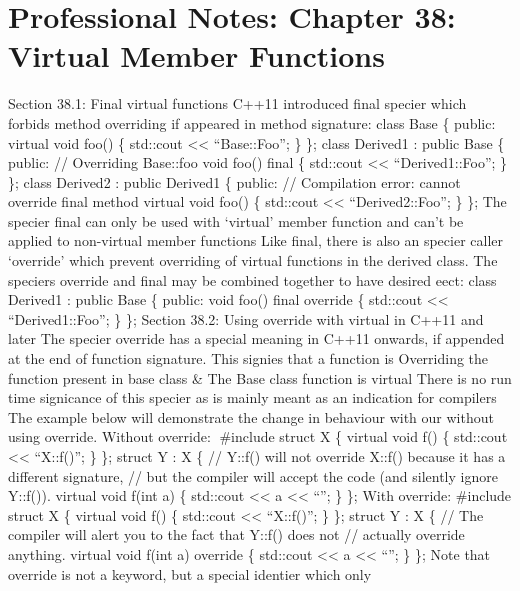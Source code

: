 \hypertarget{professional-notes-chapter-38-virtual-member-functions-1}{%
\chapter{Professional Notes: Chapter 38: Virtual Member
Functions}\label{professional-notes-chapter-38-virtual-member-functions-1}}

Section 38.1: Final virtual functions C++11 introduced final specier
which forbids method overriding if appeared in method signature: class
Base \{ public: virtual void foo() \{ std::cout \textless\textless{}
``Base::Foo\n''; \} \}; class Derived1 : public Base \{ public: //
Overriding Base::foo void foo() final \{ std::cout \textless\textless{}
``Derived1::Foo\n''; \} \}; class Derived2 : public Derived1 \{ public:
// Compilation error: cannot override final method virtual void foo() \{
std::cout \textless\textless{} ``Derived2::Foo\n''; \} \}; The specier
final can only be used with `virtual' member function and can't be
applied to non-virtual member functions Like final, there is also an
specier caller `override' which prevent overriding of virtual functions
in the derived class. The speciers override and final may be combined
together to have desired eect: class Derived1 : public Base \{ public:
void foo() final override \{ std::cout \textless\textless{}
``Derived1::Foo\n''; \} \}; Section 38.2: Using override with virtual in
C++11 and later The specier override has a special meaning in C++11
onwards, if appended at the end of function signature. This signies that
a function is Overriding the function present in base class \& The Base
class function is virtual There is no run time signicance of this
specier as is mainly meant as an indication for compilers The example
below will demonstrate the change in behaviour with our without using
override. Without override: \#include struct X \{ virtual void f() \{
std::cout \textless\textless{} ``X::f()\n''; \} \}; struct Y : X \{ //
Y::f() will not override X::f() because it has a different signature, //
but the compiler will accept the code (and silently ignore Y::f()).
virtual void f(int a) \{ std::cout \textless\textless{} a
\textless\textless{} ``\n''; \} \}; With override: \#include struct X \{
virtual void f() \{ std::cout \textless\textless{} ``X::f()\n''; \} \};
struct Y : X \{ // The compiler will alert you to the fact that Y::f()
does not // actually override anything. virtual void f(int a) override
\{ std::cout \textless\textless{} a \textless\textless{} ``\n''; \} \};
Note that override is not a keyword, but a special identier which only
